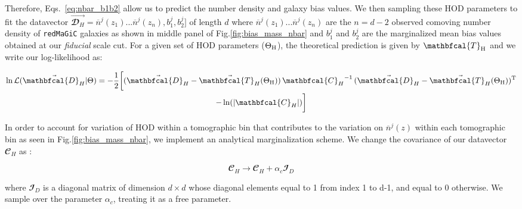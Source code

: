 \documentclass[fleqn,usenatbib]{mnras}
\newcommand{\redmagic}{\texttt{redMaGiC} }
\begin{document}
Therefore, Eqs.~\ref{eq:nbar_b1b2} allow us to predict the number density and galaxy bias values. We then sampling these HOD parameters to fit the datavector $\vec{\mathbfcal{D}_H} = \overline{n}^j(z_1)...\overline{n}^j(z_{n}),b^j_1,b^j_2]$ of length $d$ where $\overline{n}^j(z_1)...\overline{n}^j(z_{n})$ are the $n=d-2$ observed comoving number density of \redmagic galaxies as shown in middle panel of Fig.\ref{fig:bias_mass_nbar} and $b^j_1$ and $b^j_2$ are the marginalized mean bias values obtained at our \textit{fiducial} scale cut. For a given set of HOD parameters ($\Theta_{\rm H}$), the theoretical prediction is given by $\mathbfcal{T}_{\rm H}$ and we write our log-likelihood as:
\begin{linenomath*}
\begin{multline}
    \ln \mathcal{L}(\vec{\mathbfcal{D}_H}|\Theta) = -\frac{1}{2} \bigg[ (\vec{\mathbfcal{D}_H} - \vec{\mathbfcal{T}_H}(\Theta_{\rm H})) \, {\mathbfcal{C}_H}^{-1} \,  (\vec{\mathbfcal{D}_H} - \vec{\mathbfcal{T}_H}(\Theta_{\rm H}))^{\rm T} \\ -  \ln(|\mathbfcal{C}_H|) \bigg]
\end{multline}
\end{linenomath*}
In order to account for variation of HOD within a tomographic bin that contributes to the variation on $\overline{n}^j(z)$ within each tomographic bin as seen in Fig.\ref{fig:bias_mass_nbar}, we implement an analytical marginalization scheme. We change the covariance of our datavector $\mathbfcal{C}_H$ as :
\begin{linenomath*}
\begin{equation}
    \mathbfcal{C}_H \to \mathbfcal{C}_H + \alpha_{c} \mathbfcal{I}_D
\end{equation}
\end{linenomath*}
where $\mathbfcal{I}_D$ is a diagonal matrix of dimension $d\times d$ whose diagonal elements equal to 1 from index 1 to d-1, and equal to 0 otherwise. We sample over the parameter $\alpha_{c}$, treating it as a free parameter. 








\bsp	%
\label{lastpage}

% 
%  
\end{document}

